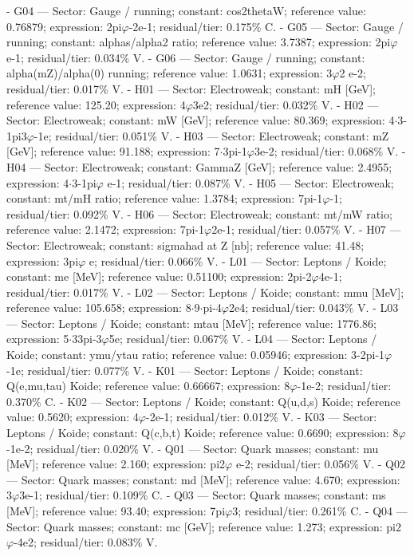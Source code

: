   - G04 --- Sector: Gauge / running; constant: cos2thetaW; reference value: 0.76879;
  expression: 2pi$\varphi$-2e-1; residual/tier: 0.175\% C.
  - G05 --- Sector: Gauge / running; constant: alphas/alpha2 ratio; reference value:
  3.7387; expression: 2pi$\varphi$ e-1; residual/tier: 0.034\% V.
  - G06 --- Sector: Gauge / running; constant: alpha(mZ)/alpha(0) running; reference
  value: 1.0631; expression: 3$\varphi$2 e-2; residual/tier: 0.017\% V.
  - H01 --- Sector: Electroweak; constant: mH [GeV]; reference value: 125.20; expression:
  4$\varphi$3e2; residual/tier: 0.032\% V.
  - H02 --- Sector: Electroweak; constant: mW [GeV]; reference value: 80.369; expression:
  4$\cdot$3-1pi3$\varphi$-1e; residual/tier: 0.051\% V.
  - H03 --- Sector: Electroweak; constant: mZ [GeV]; reference value: 91.188; expression:
  7$\cdot$3pi-1$\varphi$3e-2; residual/tier: 0.068\% V.
  - H04 --- Sector: Electroweak; constant: GammaZ [GeV]; reference value: 2.4955;
  expression: 4$\cdot$3-1pi$\varphi$ e-1; residual/tier: 0.087\% V.
  - H05 --- Sector: Electroweak; constant: mt/mH ratio; reference value: 1.3784;
  expression: 7pi-1$\varphi$-1; residual/tier: 0.092\% V.
  - H06 --- Sector: Electroweak; constant: mt/mW ratio; reference value: 2.1472;
  expression: 7pi-1$\varphi$2e-1; residual/tier: 0.057\% V.
  - H07 --- Sector: Electroweak; constant: sigmahad at Z [nb]; reference value: 41.48;
  expression: 3pi$\varphi$ e; residual/tier: 0.066\% V.
  - L01 --- Sector: Leptons / Koide; constant: me [MeV]; reference value: 0.51100;
  expression: 2pi-2$\varphi$4e-1; residual/tier: 0.017\% V.
  - L02 --- Sector: Leptons / Koide; constant: mmu [MeV]; reference value: 105.658;
  expression: 8$\cdot$9$\cdot$pi-4$\varphi$2e4; residual/tier: 0.043\% V.
  - L03 --- Sector: Leptons / Koide; constant: mtau [MeV]; reference value: 1776.86;
  expression: 5$\cdot$33pi-3$\varphi$5e; residual/tier: 0.067\% V.
  - L04 --- Sector: Leptons / Koide; constant: ymu/ytau ratio; reference value: 0.05946;
  expression: 3-2pi-1$\varphi$-1e; residual/tier: 0.077\% V.
  - K01 --- Sector: Leptons / Koide; constant: Q(e,mu,tau) Koide; reference value: 0.66667;
  expression: 8$\varphi$-1e-2; residual/tier: 0.370\% C.
  - K02 --- Sector: Leptons / Koide; constant: Q(u,d,s) Koide; reference value: 0.5620;
  expression: 4$\varphi$-2e-1; residual/tier: 0.012\% V.
  - K03 --- Sector: Leptons / Koide; constant: Q(c,b,t) Koide; reference value: 0.6690;
  expression: 8$\varphi$-1e-2; residual/tier: 0.020\% V.
  - Q01 --- Sector: Quark masses; constant: mu [MeV]; reference value: 2.160; expression:
  pi2$\varphi$ e-2; residual/tier: 0.056\% V.
  - Q02 --- Sector: Quark masses; constant: md [MeV]; reference value: 4.670; expression:
  3$\varphi$3e-1; residual/tier: 0.109\% C.
  - Q03 --- Sector: Quark masses; constant: ms [MeV]; reference value: 93.40; expression:
  7pi$\varphi$3; residual/tier: 0.261\% C.
  - Q04 --- Sector: Quark masses; constant: mc [GeV]; reference value: 1.273; expression:
  pi2$\varphi$-4e2; residual/tier: 0.083\% V.

